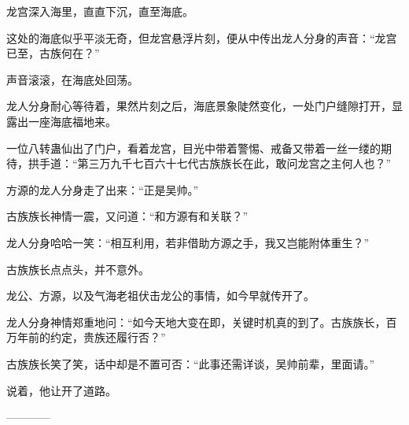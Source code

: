 \begin{this_body}
龙宫深入海里，直直下沉，直至海底。

这处的海底似乎平淡无奇，但龙宫悬浮片刻，便从中传出龙人分身的声音：“龙宫已至，古族何在？”

声音滚滚，在海底处回荡。

龙人分身耐心等待着，果然片刻之后，海底景象陡然变化，一处门户缝隙打开，显露出一座海底福地来。

一位八转蛊仙出了门户，看着龙宫，目光中带着警惕、戒备又带着一丝一缕的期待，拱手道：“第三万九千七百六十七代古族族长在此，敢问龙宫之主何人也？”

方源的龙人分身走了出来：“正是吴帅。”

古族族长神情一震，又问道：“和方源有和关联？”

龙人分身哈哈一笑：“相互利用，若非借助方源之手，我又岂能附体重生？”

古族族长点点头，并不意外。

龙公、方源，以及气海老祖伏击龙公的事情，如今早就传开了。

龙人分身神情郑重地问：“如今天地大变在即，关键时机真的到了。古族族长，百万年前的约定，贵族还履行否？”

古族族长笑了笑，话中却是不置可否：“此事还需详谈，吴帅前辈，里面请。”

说着，他让开了道路。

------------

\end{this_body}


